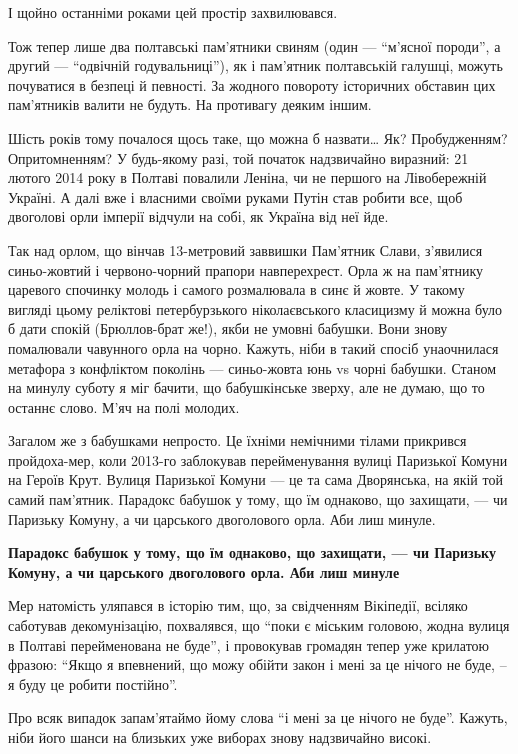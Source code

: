 І щойно останніми роками цей простір захвилювався.

Тож тепер лише два полтавські пам'ятники свиням (один --- \enquote{м'ясної породи}, а
другий --- \enquote{одвічній годувальниці}), як і пам'ятник полтавській галушці, можуть
почуватися в безпеці й певності. За жодного повороту історичних обставин цих
пам'ятників валити не будуть. На противагу деяким іншим.

Шість років тому почалося щось таке, що можна б назвати… Як? Пробудженням?
Опритомненням? У будь-якому разі, той початок надзвичайно виразний: 21 лютого
2014 року в Полтаві повалили Леніна, чи не першого на Лівобережній Україні. А
далі вже і власними своїми руками Путін став робити все, щоб двоголові орли
імперії відчули на собі, як Україна від неї йде.

Так над орлом, що вінчав 13-метровий заввишки Пам'ятник Слави, з'явилися
синьо-жовтий і червоно-чорний прапори навперехрест. Орла ж на пам'ятнику
царевого спочинку молодь і самого розмалювала в синє й жовте. У такому вигляді
цьому реліктові петербурзького ніколаєвського класицизму й можна було б дати
спокій (Брюллов-брат же!), якби не умовні бабушки. Вони знову помалювали
чавунного орла на чорно. Кажуть, ніби в такий спосіб унаочнилася метафора з
конфліктом поколінь --- синьо-жовта юнь vs чорні бабушки. Станом на минулу суботу
я міг бачити, що бабушкінське зверху, але не думаю, що то останнє слово. М'яч
на полі молодих.

Загалом же з бабушками непросто. Це їхніми немічними тілами прикрився
пройдоха-мер, коли 2013-го заблокував перейменування вулиці Паризької Комуни на
Героїв Крут. Вулиця Паризької Комуни --- це та сама Дворянська, на якій той самий
пам'ятник. Парадокс бабушок у тому, що їм однаково, що захищати, --- чи Паризьку
Комуну, а чи царського двоголового орла. Аби лиш минуле.

\begin{leftbar}
	\bfseries
Парадокс бабушок у тому, що їм однаково, що захищати, --- чи Паризьку Комуну, а
чи царського двоголового орла. Аби лиш минуле
\end{leftbar}

Мер натомість уляпався в історію тим, що, за свідченням Вікіпедії, всіляко
саботував декомунізацію, похвалявся, що \enquote{поки є міським головою, жодна вулиця в
Полтаві перейменована не буде}, і провокував громадян тепер уже крилатою
фразою: \enquote{Якщо я впевнений, що можу обійти закон і мені за це нічого не буде, –
я буду це робити постійно}.

Про всяк випадок запам'ятаймо йому слова \enquote{і мені за це нічого не буде}. Кажуть,
ніби його шанси на близьких уже виборах знову надзвичайно високі.

